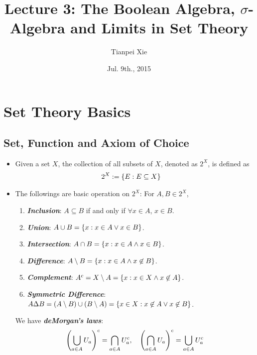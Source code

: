 \documentclass[11pt]{article}
\begin{document}
\title{Lecture 3: The Boolean Algebra, $\sigma$-Algebra and Limits in Set Theory}
\author{ Tianpei Xie}
\date{ Jul. 9th., 2015 }
\maketitle
\tableofcontents
\newpage
\section{Set Theory Basics}
\subsection{Set, Function and Axiom of Choice}
\begin{itemize}
\item \begin{definition}
Given a set $X$, the collection of all subsets of $X$, denoted as $2^X$, is defined as
\begin{align*}
2^X &:= \left\{E: E \subseteq X\right\}
\end{align*}
\end{definition}

\item \begin{remark}
The followings are basic operation on $2^X$: For $A, B \in 2^X$,
\begin{enumerate}
\item \emph{\textbf{Inclusion}}:   $A \subseteq B$ if and only if $\forall x \in A$, $x \in B$.
\item \emph{\textbf{Union}}:  $A \cup B = \left\{x: x \in A \lor x \in B\right\}$.
\item \emph{\textbf{Intersection}}:  $A \cap B = \left\{x: x \in A \land x \in B\right\}$.
\item \emph{\textbf{Difference}}:  $A \setminus B = \left\{x: x \in A \land x \not\in B\right\}$.
\item \emph{\textbf{Complement}}: $A^{c} = X \setminus A = \left\{x: x \in X \land x \not\in A\right\}$.
\item \emph{\textbf{Symmetric Difference}}:  $A \Delta B = (A \setminus B) \cup (B \setminus A) = \left\{x \in X: x \not\in A \lor x \not\in B\right\}$.
\end{enumerate}
We have \emph{\textbf{deMorgan's laws}}:
\begin{align*}
\left(\bigcup_{a \in A}U_a\right)^c = \bigcap_{a \in A}U_a^c, \quad \left(\bigcap_{a \in A}U_a\right)^c = \bigcup_{a \in A}U_a^c
\end{align*}
\end{remark}


\end{itemize}
\end{document}
